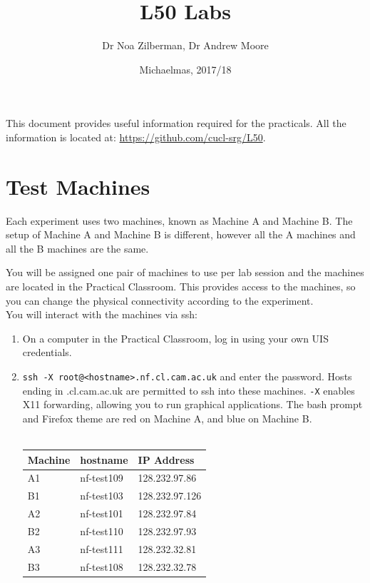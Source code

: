 \documentclass[]{scrartcl}
\title{L50 Labs}
\author{Dr Noa Zilberman, Dr Andrew Moore}
\date{Michaelmas, 2017/18}
\begin{document}
\maketitle

This document provides useful information required for the practicals.  
All the information is located at: \url{https://github.com/cucl-srg/L50}.

\section{Test Machines}


Each experiment uses two machines, known as Machine A and Machine B. The setup of Machine A and Machine B is different, however all the A machines and all the B machines are the same. 

You will be assigned one pair of machines to use per lab session and the machines are located in the Practical Classroom. This provides access to the machines, so you can change the physical connectivity according to the experiment. \\

You will interact with the machines via ssh:

\begin{enumerate}
	\item On a computer in the Practical Classroom, log in using your own UIS credentials.
	\item \texttt{ssh -X root@<hostname>.nf.cl.cam.ac.uk} and enter the password. Hosts ending in .cl.cam.ac.uk are permitted to ssh into these machines. \texttt{-X} enables X11 forwarding, allowing you to run graphical applications. The bash prompt and Firefox theme are red on Machine A, and blue on Machine B.\\
	\\
	\begin{tabular}{| l | l | l|}
		\hline
		Machine & hostname & IP Address  \\ \hline
		A1 & nf-test109 & 128.232.97.86  \\ \hline
		B1 & nf-test103 & 128.232.97.126 \\ \hline
		A2 & nf-test101 & 128.232.97.84 \\ \hline
		B2 & nf-test110 & 128.232.97.93 \\ \hline
		A3 & nf-test111 & 128.232.32.81 \\ \hline
		B3 & nf-test108 & 128.232.32.78 \\
		\hline
	\end{tabular}
\end{enumerate}	
\end{document}
